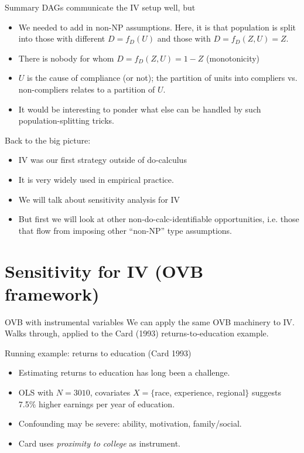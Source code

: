 \documentclass[xcolor=dvipsnames]{beamer}
\begin{document}
\begin{frame}{Summary}
\small
{} DAGs communicate the IV setup well, but 
\footnotesize
\begin{itemize}
\item We needed to add in non-NP assumptions. Here, it is that population is split into those with different $D=f_D(U)$ and those with $D=f_D(Z,U)=Z$. 
\smallskip
\item There is nobody for whom $D=f_D(Z,U) = 1-Z$ (monotonicity)
\smallskip
\item $U$ is the cause of compliance (or not); the partition of units into compliers vs. non-compliers relates to a partition of $U$. 
\smallskip
\item It would be interesting to ponder what else can be handled by such population-splitting tricks.
\end{itemize}

 Back to the big picture:\\
\begin{itemize}
\item IV was our first strategy outside of do-calculus
\item It is very widely used in empirical practice. 
\item We will talk about sensitivity analysis for IV
\item But first we will look at other non-do-calc-identifiable opportunities, i.e. those that flow from imposing other ``non-NP'' type assumptions.
\end{itemize}
\end{frame}


\section{Sensitivity for IV (OVB framework)}

\begin{frame}{OVB with instrumental variables}
\small
We can apply the same OVB machinery to IV. Walks through, applied to the Card (1993) returns-to-education example.
\end{frame}


\begin{frame}{Running example: returns to education (Card 1993)}
\small
\begin{itemize}
\item<1-> Estimating returns to education has long been a challenge.
\item<2-> OLS with $N=3010$, covariates $X = \{$race, experience, regional$\}$ suggests 7.5\% higher earnings per year of education.
\item<3-> Confounding may be severe: ability, motivation, family/social.
\item<4-> Card uses \textit{proximity to college} as instrument.
\end{itemize}
\end{frame}
\end{document}
